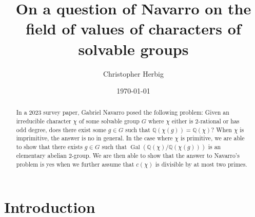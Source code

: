 \documentclass[12pt]{amsart}
\theoremstyle{definition}
\newcommand{\Q}{\mathbb{Q}}
\DeclareMathOperator{\Gal}{Gal}
\begin{document}
	
	\title[On a question of Navarro]{On a question of Navarro on the field of values of characters of solvable groups}
	
	
	\author[Christopher Herbig]{Christopher Herbig}
	\address{%
		Little Priest Tribal College\\
		Winnebago, NE 68071 \\
		USA}
	
	
	
	
	
	
	\date{\today}
	
	\maketitle
	
	\begin{abstract}
		In a 2023 survey paper, Gabriel Navarro posed the following problem: Given an irreducible character $\chi$ of some solvable group $G$ where $\chi$ either is 2-rational or has odd degree, does there exist some $g \in G$ such that $\Q(\chi(g)) = \Q(\chi)$? When $\chi$ is imprimitive, the answer is no in general. In the case where $\chi$ is primitive, we are able to show that there exists $g \in G$ such that $\Gal(\Q(\chi)/\Q(\chi(g)))$ is an elementary abelian 2-group. We are then able to show that the answer to Navarro's problem is yes when we further assume that $c(\chi)$ is divisible by at most two primes.
	\end{abstract}
	
	
\section{Introduction}
\end{document}
